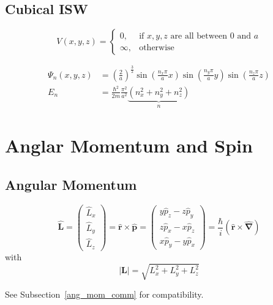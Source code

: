 \subsection{Cubical ISW}
\noindent\begin{equation*}
    V(x,y,z)=\begin{cases}0,&\text{if }x,y,z\text{ are all between }0\text{ and }a\\\infty,&\text{otherwise}\end{cases}
\end{equation*}

\noindent\begin{align*}
    \Psi_n \left(x,y,z\right) & ={\left(\frac{2}{a}\right)}^{\frac{3}{2}} \sin\left(\frac{n_{x}\pi}{a}x\right)\sin\left(\frac{n_{y}\pi}{a}y\right)\sin\left(\frac{n_{z}\pi}{a}z\right) \\
    E_n                       & = \frac{\hbar^{2}}{2m} \frac{\pi^{2}}{a^{2}} \underbrace{\left(n_{x}^{2}+n_{y}^{2}+n_{z}^{2}\right)}_{n}
\end{align*}

\section{Anglar Momentum and Spin}
\subsection{Angular Momentum}
\noindent\begin{equation*}
    \widehat{\mathbf{L}}=
    \begin{pmatrix}
        \widehat{L}_x \\
        \widehat{L}_y \\
        \widehat{L}_z
    \end{pmatrix}
    =\widehat{\mathbf{r}}\times\widehat{\mathbf{p}}
    =
    \begin{pmatrix}
        y\widehat{p}_z-z\widehat{p}_y \\
        z\widehat{p}_x-x\widehat{p}_z \\
        x\widehat{p}_y-y\widehat{p}_x
    \end{pmatrix}
    =\frac{\hbar}{i}(\mathbf{\widehat{r}}\times\widehat{\mathbf{\nabla}})
\end{equation*}
with
\begin{equation*}
    |\mathbf{L}|=\sqrt{L_{x}^{2}+L_{y}^{2}+L_{z}^{2}}
\end{equation*}

See Subsection~\ref{ang_mom_comm} for compatibility.

